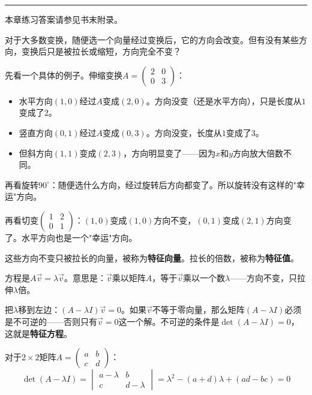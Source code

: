 \documentclass[a4paper,12pt]{ctexart}
\begin{document}
\vfill
\noindent\rule{\textwidth}{0.4pt}
本章练习答案请参见书末附录。

\newpage



对于大多数变换，随便选一个向量经过变换后，它的方向会改变。但有没有某些方向，变换后只是被拉长或缩短，方向完全不变？

先看一个具体的例子。伸缩变换$A=\begin{pmatrix}2&0\\0&3\end{pmatrix}$：
\begin{itemize}
\item 水平方向$(1,0)$经过$A$变成$(2,0)$。方向没变（还是水平方向），只是长度从$1$变成了$2$。
\item 竖直方向$(0,1)$经过$A$变成$(0,3)$。方向没变，长度从$1$变成了$3$。
\item 但斜方向$(1,1)$变成$(2,3)$，方向明显变了——因为$x$和$y$方向放大倍数不同。
\end{itemize}

再看旋转$90^\circ$：随便选什么方向，经过旋转后方向都变了。所以旋转没有这样的"幸运"方向。

再看切变$\begin{pmatrix}1&2\\0&1\end{pmatrix}$：$(1,0)$变成$(1,0)$方向不变，$(0,1)$变成$(2,1)$方向变了。水平方向也是一个"幸运"方向。

这些方向不变只被拉长的向量，被称为\textbf{特征向量}。拉长的倍数，被称为\textbf{特征值}。


方程是$A\vec v=\lambda\vec v$。意思是：$\vec v$乘以矩阵$A$，等于$\vec v$乘以一个数$\lambda$——方向不变，只拉伸$\lambda$倍。

把$\lambda$移到左边：$(A-\lambda I)\vec v=0$。如果$\vec v$不等于零向量，那么矩阵$(A-\lambda I)$必须是不可逆的——否则只有$\vec v=0$这一个解。不可逆的条件是$\det(A-\lambda I)=0$，这就是\textbf{特征方程}。

对于$2\times2$矩阵$A=\begin{pmatrix}a&b\\c&d\end{pmatrix}$：
\[
\det(A-\lambda I)=\begin{vmatrix}a-\lambda&b\\c&d-\lambda\end{vmatrix}
= \lambda^2-(a+d)\lambda+(ad-bc)=0
\]
\end{document}
